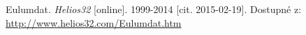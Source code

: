 \begin{thebibliography}{1}

Eulumdat. \textit{Helios32} [online]. 1999-2014 [cit. 2015-02-19]. Dostupné z: \url{http://www.helios32.com/Eulumdat.htm}

\end{thebibliography}